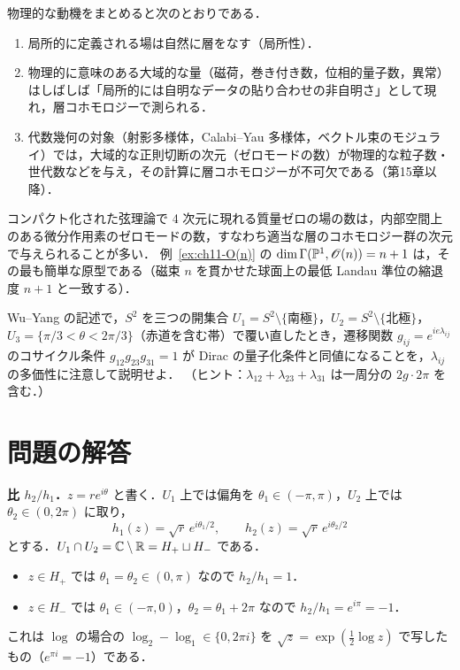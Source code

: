 物理的な動機をまとめると次のとおりである．
\begin{enumerate}
  \item 局所的に定義される場は自然に層をなす（局所性）．
  \item 物理的に意味のある大域的な量（磁荷，巻き付き数，位相的量子数，異常）はしばしば「局所的には自明なデータの貼り合わせの非自明さ」として現れ，層コホモロジーで測られる．
  \item 代数幾何の対象（射影多様体，Calabi--Yau 多様体，ベクトル束のモジュライ）では，大域的な正則切断の次元（ゼロモードの数）が物理的な粒子数・世代数などを与え，その計算に層コホモロジーが不可欠である（第15章以降）．
\end{enumerate}

\begin{physbox}[ゼロモードの数え上げ]
コンパクト化された弦理論で 4 次元に現れる質量ゼロの場の数は，内部空間上のある微分作用素のゼロモードの数，すなわち適当な層のコホモロジー群の次元で与えられることが多い．
例~\ref{ex:ch11-O(n)} の $\dim\Gamma(\mathbb{P}^1,\mathscr{O}(n))=n+1$ は，その最も簡単な原型である（磁束 $n$ を貫かせた球面上の最低 Landau 準位の縮退度 $n+1$ と一致する）．
\end{physbox}

Wu--Yang の記述で，$S^2$ を三つの開集合 $U_1=S^2\setminus\{\text{南極}\}$，$U_2=S^2\setminus\{\text{北極}\}$，$U_3=\{\pi/3<\theta<2\pi/3\}$（赤道を含む帯）で覆い直したとき，遷移関数 $g_{ij}=e^{ie\lambda_{ij}}$ のコサイクル条件 $g_{12}g_{23}g_{31}=1$ が Dirac の量子化条件と同値になることを，$\lambda_{ij}$ の多価性に注意して説明せよ．
（ヒント：$\lambda_{12}+\lambda_{23}+\lambda_{31}$ は一周分の $2g\cdot2\pi$ を含む．）

\section*{問題の解答}

\textbf{比 $h_2/h_1$．}$z=re^{i\theta}$ と書く．$U_1$ 上では偏角を $\theta_1\in(-\pi,\pi)$，$U_2$ 上では $\theta_2\in(0,2\pi)$ に取り，
\[
  h_1(z)=\sqrt r\,e^{i\theta_1/2},\qquad h_2(z)=\sqrt r\,e^{i\theta_2/2}
\]
とする．$U_1\cap U_2=\mathbb{C}\setminus\mathbb{R}=H_+\sqcup H_-$ である．
\begin{itemize}
  \item $z\in H_+$ では $\theta_1=\theta_2\in(0,\pi)$ なので $h_2/h_1=1$．
  \item $z\in H_-$ では $\theta_1\in(-\pi,0)$，$\theta_2=\theta_1+2\pi$ なので $h_2/h_1=e^{i\pi}=-1$．
\end{itemize}
これは $\log$ の場合の $\log_2-\log_1\in\{0,2\pi i\}$ を $\sqrt z=\exp(\tfrac12\log z)$ で写したもの（$e^{\pi i}=-1$）である．

